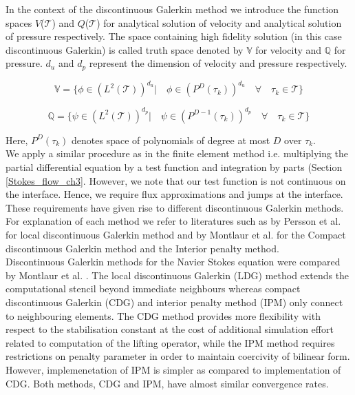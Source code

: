 \documentclass[a4paper,openany]{book}
\begin{document}
In the context of the discontinuous Galerkin method we introduce the function spaces $V$($\mathcal{T}$) and $Q$($\mathcal{T}$) for analytical solution of velocity and analytical solution of pressure respectively. The space containing high fidelity solution (in this case discontinuous Galerkin) is called truth space denoted by $\mathbb{V}$ for velocity and $\mathbb{Q}$ for pressure. $d_u$ and $d_p$ represent the dimension of velocity and pressure respectively.

\begin{equation} \label{velocity_test}
\mathbb{V} = \lbrace \phi \in (L^2(\mathcal{T}))^{d_u}| \quad \phi \in (P^D(\tau_k))^{d_u} \quad \forall \quad {\tau_k} \in \mathcal{T} \rbrace
\end{equation}

\begin{equation} \label{pressure_test}
\mathbb{Q} = \lbrace \psi \in (L^2(\mathcal{T}))^{d_p}| \quad \psi \in (P^{D-1}(\tau_k))^{d_p} \quad \forall \quad {\tau_k} \in \mathcal{T} \rbrace
\end{equation}

Here, $P^D(\tau_k)$ denotes space of polynomials of degree at most $D$ over $\tau_k$.\\

We apply a similar procedure as in the finite element method i.e. multiplying the partial differential equation by a test function and integration by parts (Section \ref{Stokes_flow_ch3}. However, we note that our test function is not continuous on the interface. Hence, we require flux approximations and jumps at the interface. These requirements have given rise to different discontinuous Galerkin methods. For explanation of each method we refer to literatures such as by Persson et al. \cite{persson} for local discontinuous Galerkin method and by Montlaur et al. \cite{Montlaur} for the Compact discontinuous Galerkin method and the Interior penalty method. \\

Discontinuous Galerkin methods for the Navier Stokes equation were compared by Montlaur et al. \cite{Montlaur}. The local discontinuous Galerkin (LDG) method extends the computational stencil beyond immediate neighbours whereas compact discontinuous Galerkin (CDG) and interior penalty method (IPM) only connect to neighbouring elements. The CDG method provides more flexibility with respect to the stabilisation constant at the cost of additional simulation effort related to computation of the lifting operator, while the IPM method requires restrictions on penalty parameter in order to maintain coercivity of bilinear form. However, implemenetation of IPM is simpler as compared to implementation of CDG. Both methods, CDG and IPM, have almost similar convergence rates. 
\end{document}
